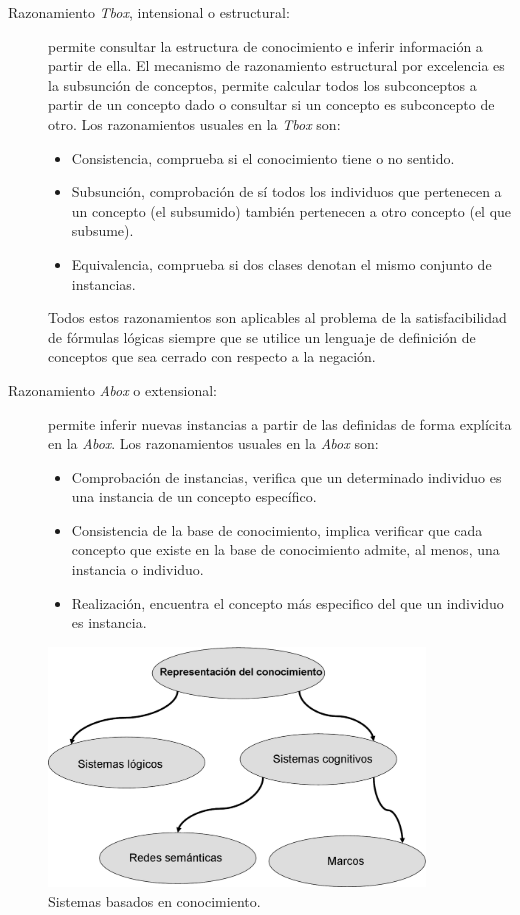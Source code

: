 \begin{description}
\item[Razonamiento \textit{Tbox}, intensional o estructural:] permite consultar la estructura de
conocimiento e inferir información a partir de ella. El mecanismo de
razonamiento estructural por excelencia es la subsunción de conceptos, permite
calcular todos los subconceptos a partir de un concepto dado o consultar si un concepto
es subconcepto de otro. Los razonamientos usuales en la \textit{Tbox} son: \begin{itemize} \item Consistencia, comprueba si el conocimiento tiene o no sentido. 
\item Subsunción, comprobación de sí todos los individuos que pertenecen a un concepto (el
subsumido) también pertenecen a otro concepto (el que subsume). \item 
Equivalencia, comprueba si dos clases denotan el mismo conjunto de instancias. \end{itemize}

Todos estos razonamientos son aplicables al problema de la satisfacibilidad de
fórmulas lógicas siempre que se utilice un lenguaje de definición de conceptos que
sea cerrado con respecto a la negación.

\item[Razonamiento \textit{Abox} o extensional:] permite inferir nuevas instancias a partir de las
definidas de forma explícita en la \textit{Abox}. Los razonamientos usuales en la \textit{Abox} son:
\begin{itemize}
\item Comprobación de instancias, verifica que un determinado individuo es una instancia de un concepto específico. 
\item  Consistencia de la base de conocimiento, implica verificar que cada
concepto que existe en la base de conocimiento admite, al menos, una instancia o
individuo. 
\item Realización, encuentra el concepto más
especifico del que un individuo es instancia.\end{itemize}

\end{description}

\begin{figure}[htb]
\centering
	\includegraphics[width=10cm]{images/knowledge}
\caption{Sistemas basados en conocimiento.}
\label{fig:knowledge}
\end{figure}



